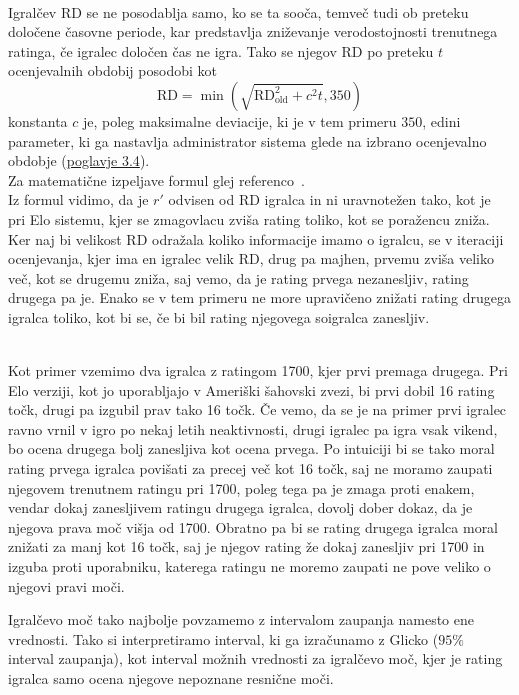 \documentclass{IEEEtran}
\begin{document}
\\
Igralčev $\mathrm{RD}$ se ne posodablja samo, ko se ta sooča, temveč tudi ob preteku določene časovne periode, kar predstavlja zniževanje verodostojnosti trenutnega ratinga, če igralec določen čas ne igra.
Tako se njegov $\mathrm{RD}$ po preteku $t$ ocenjevalnih obdobij posodobi kot
\begin{equation}
\label{eq:rdupdate}
    \mathrm{RD} = \min\left(\sqrt{\mathrm{RD}_\mathrm{old}^{2} + c^{2}t}, 350\right)
\end{equation}
konstanta $c$ je, poleg maksimalne deviacije, ki je v tem primeru $350$, edini parameter, ki ga nastavlja administrator sistema glede na izbrano ocenjevalno
obdobje (\hyperref[sec:glicko]{poglavje 3.4}).
\hfill
\\
Za matematične izpeljave formul glej referenco~\cite{glickoPaper}. 
\hfill
\\


Iz formul vidimo, da je $r'$ odvisen od $\mathrm{RD}$ igralca in ni uravnotežen tako, kot je pri Elo sistemu, kjer se zmagovlacu zviša rating toliko, kot se poražencu zniža. Ker naj bi velikost $\mathrm{RD}$ odražala koliko informacije imamo o igralcu, se v iteraciji ocenjevanja, kjer ima en igralec velik $\mathrm{RD}$, drug pa majhen, prvemu zviša veliko več, kot se drugemu zniža, saj vemo, da je rating prvega nezanesljiv, rating drugega pa je. Enako se v tem primeru ne more upravičeno znižati rating drugega igralca toliko, kot bi se, če bi bil rating njegovega soigralca zanesljiv.

\hfill
\\
Kot primer vzemimo dva igralca z ratingom 1700, kjer prvi premaga drugega. Pri Elo verziji, kot jo uporabljajo v Ameriški šahovski zvezi, bi prvi
dobil 16 rating točk, drugi pa izgubil prav tako 16 točk. Če vemo, da se je na primer prvi igralec ravno vrnil v igro po nekaj letih neaktivnosti, 
drugi igralec pa igra vsak vikend, bo ocena drugega bolj zanesljiva kot ocena prvega. Po intuiciji bi se tako moral rating prvega igralca povišati za precej več kot 16 točk, saj ne moramo zaupati njegovem trenutnem ratingu pri 1700, poleg tega pa je zmaga proti enakem, vendar dokaj zanesljivem ratingu drugega igralca, dovolj dober dokaz, da je njegova prava moč višja od 1700. Obratno pa bi se rating drugega igralca moral znižati za manj kot 16 točk, saj je njegov rating že dokaj zanesljiv pri 1700 in izguba proti uporabniku, katerega ratingu ne moremo zaupati ne pove veliko o njegovi pravi moči.

\newpage
Igralčevo moč tako najbolje povzamemo z intervalom zaupanja namesto ene vrednosti. Tako si interpretiramo interval, ki ga izračunamo z Glicko ($95\%$ interval zaupanja), kot interval možnih vrednosti za igralčevo moč, kjer je rating igralca samo ocena njegove nepoznane resnične moči.
\end{document}
